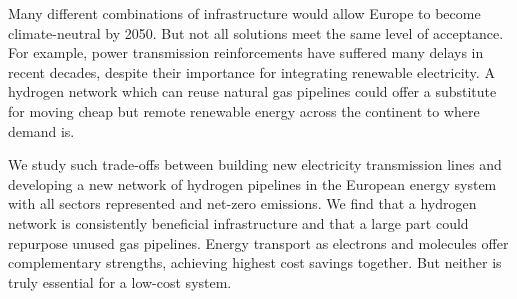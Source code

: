 

Many different combinations of infrastructure would allow Europe to become
climate-neutral by 2050. But not all solutions meet the same level of
acceptance. For example, power transmission reinforcements have suffered many
delays in recent decades, despite their importance for integrating renewable
electricity. A hydrogen network which can reuse natural gas pipelines could
offer a substitute for moving cheap but remote renewable energy across the
continent to where demand is.

We study such trade-offs between building new electricity transmission lines and
developing a new network of hydrogen pipelines in the European energy system
with all sectors represented and net-zero \co emissions. We find that a hydrogen
network is consistently beneficial infrastructure and that a large part could
repurpose unused gas pipelines. Energy transport as electrons and molecules
offer complementary strengths, achieving highest cost savings together.
But neither is truly essential for a low-cost system.
